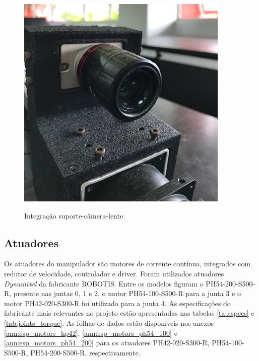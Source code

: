 \begin{figure}[H]
    \centering
    \caption{Integração suporte-câmera-lente.}
    \includegraphics[scale=2.5]{images/cam-sup-int.png}
    \label{fig:int-sup-cam}
\end{figure}



\subsection{Atuadores}

Os atuadores do manipulador são motores de corrente contínua, integrados com redutor de velocidade, controlador e driver. Foram utilizados atuadores \emph{Dynamixel} da fabricante ROBOTIS. Entre os modelos figuram o PH54-200-S500-R, presente nas juntas 0, 1 e 2, o motor PH54-100-S500-R para a junta 3 e o motor PH42-020-S300-R foi utilizado para a junta 4. As especificações do fabricante mais relevantes no projeto estão apresentadas nas tabelas \ref{tab:specs} e \ref{tab:joints_torque}. As folhas de dados estão disponíveis nos anexos \ref{ann:esp_motors_hp42}, \ref{ann:esp_motors_ph54_100} e \ref{ann:esp_motors_ph54_200} para os atuadores PH42-020-S300-R, PH54-100-S500-R, PH54-200-S500-R, respectivamente.

